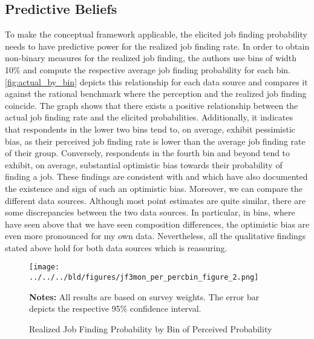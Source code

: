 \documentclass[11pt,a4paper,leqno]{article}
\begin{document}
\subsection*{Predictive Beliefs}
To make the conceptual framework applicable, the elicited job finding probability needs to have predictive power for the realized job finding rate. In order to obtain non-binary measures for the realized job finding, the authors use bins of width 10\% and compute the respective average job finding probability for each bin. \autoref{fig:actual_by_bin} depicts this relationship for each data source and compares it against the rational benchmark where the perception and the realized job finding coincide. The graph shows that there exists a positive relationship between the actual job finding rate and the elicited probabilities. Additionally, it indicates that respondents in the lower two bins tend to, on average, exhibit pessimistic bias, as their perceived job finding rate is lower than the average job finding rate of their group. Conversely, respondents in the fourth bin and beyond tend to exhibit, on average,  substantial optimistic bias towards their probability of finding a job. 
These findings are consistent with \textcite{Spinne2015} and  \textcite{Baleer2021} which have also documented the existence and sign of such an optimistic bias. Moreover, we can compare the different data sources. Although most point estimates are quite similar, there are some discrepancies between the two data sources. In particular, in bins, where have seen above that we have seen composition differences, the optimistic bias are even more pronounced for my own data. Nevertheless, all the qualitative findings stated above hold for both data sources which is reassuring.

\begin{figure}[!htbp] \centering
	\texttt{[image: ../../../bld/figures/jf3mon\_per\_percbin\_figure\_2.png]}
	\begin{minipage}[center]{\textwidth}
		\caption*{ \scriptsize \textbf{Notes:} All results are based on survey weights. The error bar depicts the respective 95\% confidence interval.}
	\end{minipage}
	\caption{Realized Job Finding Probability by Bin of Perceived Probability}
	\label{fig:actual_by_bin}
\end{figure}
\end{document}
